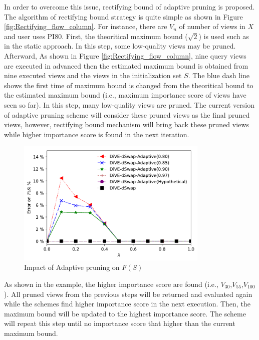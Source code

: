 \documentclass{article}
\begin{document}
In order to overcome this issue, rectifying bound of adaptive pruning is proposed. The algorithm of rectifying bound strategy is quite simple as shown in Figure \ref{fig:Rectifying_flow_column}. For instance, there are $V_n$ of number of views in $X$ and user uses PI80. First, the theoritical maximum bound ($ \sqrt{2} $) is used such as in the static approach. In this step, some low-quality views may be pruned. Afterward, As shown in Figure \ref{fig:Rectifying_flow_column}, nine query views are executed in advanced then the estimated maximum bound is obtained from nine executed views and the views in the initialization set $S$. The blue dash line shows the first time of maximum bound is changed from the theoritical bound to the estimated maximum bound (i.e., maximum importance score of views have seen so far). In this step, many low-quality views are pruned. The current version of adaptive pruning scheme will consider these pruned views as the final pruned views, however, rectifying bound mechanism will bring back these pruned views while higher importance score is found in the next iteration. 

\begin{figure}[t]
	\centering
	\includegraphics[width=3.6in]{figures/rectifiying_error_f_s_dswap}
	\vspace{-5pt}
	\caption{Impact of Adaptive pruning on $F(S)$}
	\label{fig:pruning_performance_swapd}
\end{figure}



As shown in the example, the higher importance score are found (i.e., $V_{30}$,$V_{55}$,$V_{100}$). All pruned views from the previous steps will be returned and evaluated again while the schemes find higher importance score in the next execution. Then, the maximum bound will be updated to the highest importance score. The scheme will repeat this step until no importance score that higher than the current maximum bound. 
\end{document}
